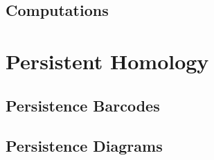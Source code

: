



%         

\subsection{Computations}

\section{Persistent Homology}

\subsection{Persistence Barcodes}


\subsection{Persistence Diagrams}

